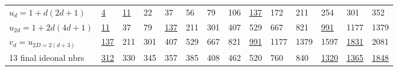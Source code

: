 \documentclass[a4paper,9pt]{article}
\begin{document}
\begin{table}
\begin{tabular}{llllllllllllll}
      
      
      
      
      $u_d = 1 + d(2d+1)$ & \underline {4} & \underline {11} & 22 & 37 & 56 & 79 & 106 & \underline{137}  & 172 & 211 & 254 & 301 & 352 \\
       
      
    
      $u_{2d} = 1 + 2d(4d+1)$ & \underline{11}  & 37 & 79 & \underline{137}  & 211 & 301 & 407 & 529  & 667 & 821 & \underline{991} & 1177 & 1379 \\
      
      $v_d = u_{2 D = 2(d+3)}$ & \underline{137}  & 211 & 301 & 407 & 529 & 667 & 821 & \underline{991} & 1177 & 1379 & 1597 & \underline{1831} & 2081 \\
      
      13 final ideonal nbrs  & \underline {312} & 330 & 345 & 357 & 385 & 408 & 462 & 520 & 760 & 840 & \underline{1320}  & \underline{1365} &\underline{1848}\\
     


\end{tabular}
\end{table}
\end{document}
